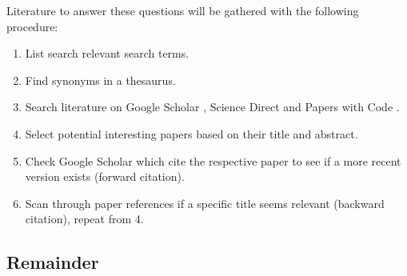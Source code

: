 Literature to answer these questions will be gathered with the following procedure:
\begin{enumerate}
\item List search relevant search terms.
\item Find synonyms in a thesaurus.
\item Search literature on Google Scholar \cite{scholar}, Science Direct \cite{science-direct} and Papers with Code \cite{paperswithcode}. 
\item Select potential interesting papers based on their title and abstract.
\item Check Google Scholar which cite the respective paper to see if a more recent version exists (forward citation).
\item Scan through paper references if a specific title seems relevant (backward citation), repeat from 4.
\end{enumerate}


\subsection{Remainder}